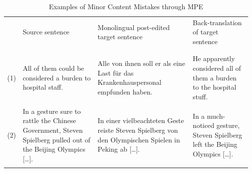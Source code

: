 \documentclass[output=paper]{langsci/langscibook}
\begin{document}
\begin{table}
\begin{tabularx}{\textwidth}{lXp{3.6cm}p{3cm}} 
    & Source \newline sentence & Monolingual post-\newline edited target sentence & Back-translation of target sentence \\
\lsptoprule
\multicolumn{3}{l}{Minor content mistakes}\\ 
\\[.1em]
(1) & All of them could be considered a burden to hospital staff. 
  & \raggedright Alle von ihnen soll er als eine Last für das Krankenhauspersonal empfunden haben. & He apparently considered all of them a burden to the hospital stuff.\\ 
\\[.1em]
(2) 
  &   In a gesture sure to rattle the Chinese Government, Steven Spielberg pulled out of the Beijing Olympics [\ldots]. & \raggedright  In einer vielbeachteten Geste reiste Steven Spielberg von den Olympischen Spielen in Peking ab [\ldots]. & In a much-noticed gesture, Steven Spielberg left the Beijing Olympics [\ldots].\\
\lspbottomrule
\end{tabularx}
\caption{Examples of Minor Content Mistakes through MPE}
\label{nitzke:tab:1a}
\end{table}
\end{document}
